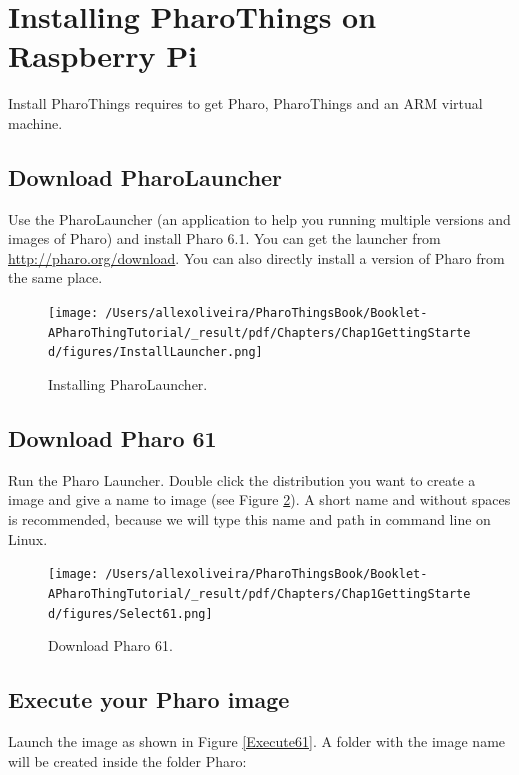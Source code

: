 \documentclass[10pt,twoside,english]{_support/latex/sbabook/sbabook}
\begin{document}
\section{Installing PharoThings on Raspberry Pi}
Install PharoThings requires to get Pharo, PharoThings and an ARM virtual machine. 
\subsection{Download PharoLauncher}
Use the PharoLauncher (an application to help you running multiple versions and images of Pharo) and install Pharo 6.1. You can get the launcher from \url{http://pharo.org/download}.
You can also directly install a version of Pharo from the same place.


\begin{figure}

\begin{center}
\texttt{[image: /Users/allexoliveira/PharoThingsBook/Booklet-APharoThingTutorial/\_result/pdf/Chapters/Chap1GettingStarted/figures/InstallLauncher.png]}\caption{Installing PharoLauncher.\label{installLauncher}}\end{center}
\end{figure}

\subsection{Download Pharo 61}
Run the Pharo Launcher. Double click the distribution you want to create a image and give a name to image (see Figure \ref{InstallPharo61}). A short name and without spaces is recommended, because we will type this name and path in command line on Linux. 


\begin{figure}

\begin{center}
\texttt{[image: /Users/allexoliveira/PharoThingsBook/Booklet-APharoThingTutorial/\_result/pdf/Chapters/Chap1GettingStarted/figures/Select61.png]}\caption{Download Pharo 61.\label{InstallPharo61}}\end{center}
\end{figure}

\subsection{Execute your Pharo image}
Launch the image as shown in Figure \ref{Execute61}. A folder with the image name will be created inside the folder Pharo:  
\end{document}

